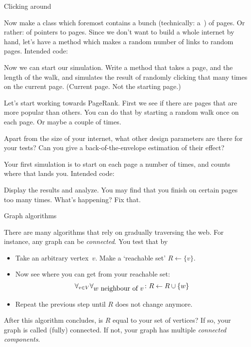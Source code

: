  {Clicking around}

\begin{exercise}
  Now make a class  which foremost contains a bunch
  (technically: a~) of pages. Or rather: of pointers to
  pages.
  Since we don't want to build a whole internet by hand, let's have a
  method  which makes a random number of links
  to random pages.
  Intended code:

  Now we can start our simulation. Write a method 
  that takes a page, and the length of the walk, and simulates the
  result of randomly clicking that many times on the current
  page. (Current page. Not the starting page.)
\end{exercise}

Let's start working towards PageRank. First we see if there are pages
that are more popular than others. You can do that by starting a
random walk once on each page. Or maybe a couple of times.

\begin{exercise}
  Apart from the size of your internet, what other design parameters are there for
  your tests? Can you give a back-of-the-envelope estimation of their effect?
\end{exercise}

\begin{exercise}
  Your first simulation is to start on each page a number of times,
  and counts where that lands you.
  Intended code:

  Display the results and analyze. You may find that you finish on
  certain pages too many times. What's happening? Fix that.
\end{exercise}

 {Graph algorithms}

There are many algorithms that rely on gradually traversing the
web. For instance, any graph can be
\emph{connected}. You test that by
\begin{itemize}
\item Take an arbitrary vertex~$v$. Make a `reachable set'
  $R\leftarrow\{v\}$.
\item Now see where you can get from your reachable set:
  \[ \forall_{v\in V}\forall_{\hbox{$w$ neighbour of $v$}}\colon
  R\leftarrow R\cup \{w\}
  \]
\item Repeat the previous step until $R$ does not change anymore. 
\end{itemize}
After this algorithm concludes, is $R$ equal to your set of vertices?
If so, your graph is called (fully) connected. If not, your graph has
multiple
%
\emph{connected components}.

